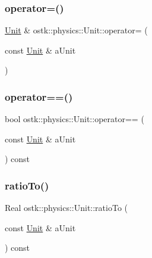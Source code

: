 \subsubsection{\texorpdfstring{operator=()}{operator=()}}
{\footnotesize\ttfamily \hyperlink{classostk_1_1physics_1_1_unit}{Unit} \& ostk\+::physics\+::\+Unit\+::operator= (\begin{DoxyParamCaption}\item[{const \hyperlink{classostk_1_1physics_1_1_unit}{Unit} \&}]{a\+Unit }\end{DoxyParamCaption})}

\mbox{\label{classostk_1_1physics_1_1_unit_a2f402b7601cef9914f8c367e44f9886c}} 
\subsubsection{\texorpdfstring{operator==()}{operator==()}}
{\footnotesize\ttfamily bool ostk\+::physics\+::\+Unit\+::operator== (\begin{DoxyParamCaption}\item[{const \hyperlink{classostk_1_1physics_1_1_unit}{Unit} \&}]{a\+Unit }\end{DoxyParamCaption}) const}

\mbox{\label{classostk_1_1physics_1_1_unit_a6c88c955a56b590f4623e8a1fa2a9cbb}} 
\subsubsection{\texorpdfstring{ratio\+To()}{ratioTo()}}
{\footnotesize\ttfamily Real ostk\+::physics\+::\+Unit\+::ratio\+To (\begin{DoxyParamCaption}\item[{const \hyperlink{classostk_1_1physics_1_1_unit}{Unit} \&}]{a\+Unit }\end{DoxyParamCaption}) const}

\mbox{\label{classostk_1_1physics_1_1_unit_a2834e4e5fa10d96212016a3cb8a02f02}} 
